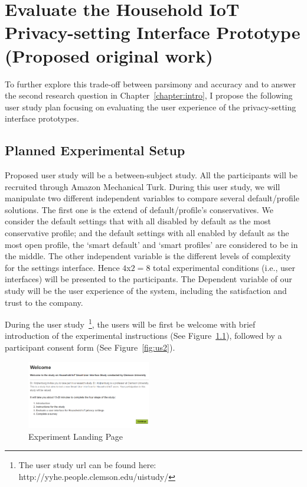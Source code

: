 \chapter{Evaluate the Household IoT Privacy-setting Interface Prototype (Proposed original work)}\label{chapter:evaluation}

To further explore this trade-off between parsimony and accuracy and to answer the second research question in Chapter~\ref{chapter:intro}, I propose the following user study plan focusing on evaluating the user experience of the privacy-setting interface prototypes.

\section{Planned Experimental Setup}
Proposed user study will be a between-subject study. All the participants will be recruited through Amazon Mechanical Turk. During this user study, we will manipulate two different independent variables to compare several default/profile solutions. The first one is the extend of default/profile's conservatives. We consider the default settings that with all disabled by default as the most conservative profile; and the default settings with all enabled by default as the most open profile, the `smart default' and `smart profiles' are considered to be in the middle. The other independent variable is the different levels of complexity for the settings interface. Hence $4$x$2=8$ total experimental conditions (i.e., user interfaces) will be presented to the participants. The Dependent variable of our study will be the user experience of the system, including the satisfaction and trust to the company.

During the user study~\footnote{The user study url can be found here: http://yyhe.people.clemson.edu/uistudy/}, the users will be first be welcome with brief introduction of the experimental instructions (See Figure~\ref{fig:us1}), followed by a participant consent form (See Figure~\ref{fig:us2}).

\begin{figure}
	\centering
	\includegraphics[width=0.48\textwidth]{figures/userstudy1.png}
	\caption{Experiment Landing Page}
	\label{fig:us1}
\end{figure}

